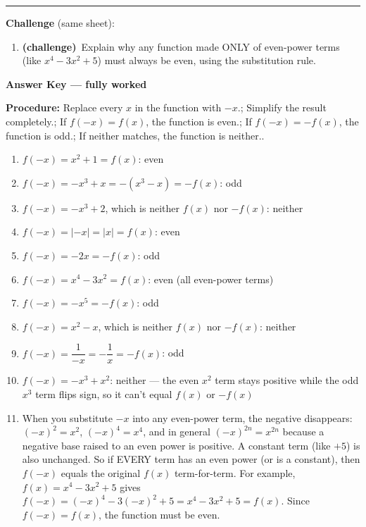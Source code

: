 \documentclass[12pt]{article}
\begin{document}
\vspace{0.2cm}\hrule\vspace{0.3cm}
\textbf{Challenge} (same sheet):\\[4pt]
\begin{enumerate}[label=\textbf{\arabic*.}, start=11, itemsep=2.2cm]
  \item \textbf{(challenge)}\ Explain why any function made ONLY of even-power terms (like $x^4-3x^2+5$) must always be even, using the substitution rule.
\end{enumerate}

\newpage

\begin{center}{\Large \textbf{Answer Key --- fully worked}}\end{center}
\vspace{0.25cm}
\textbf{Procedure:} Replace every $x$ in the function with $-x$.; Simplify the result completely.; If $f(-x)=f(x)$, the function is even.; If $f(-x)=-f(x)$, the function is odd.; If neither matches, the function is neither..\\[8pt]
\begin{enumerate}[label=\textbf{\arabic*.},itemsep=7pt]
  \item $f(-x)=x^{2}+1=f(x)$: even
  \item $f(-x)=-x^{3}+x=-(x^{3}-x)=-f(x)$: odd
  \item $f(-x)=-x^{3}+2$, which is neither $f(x)$ nor $-f(x)$: neither
  \item $f(-x)=|-x|=|x|=f(x)$: even
  \item $f(-x)=-2x=-f(x)$: odd
  \item $f(-x)=x^{4}-3x^{2}=f(x)$: even (all even-power terms)
  \item $f(-x)=-x^{5}=-f(x)$: odd
  \item $f(-x)=x^{2}-x$, which is neither $f(x)$ nor $-f(x)$: neither
  \item $f(-x)=\dfrac{1}{-x}=-\dfrac{1}{x}=-f(x)$: odd
  \item $f(-x)=-x^{3}+x^{2}$: neither --- the even $x^2$ term stays positive while the odd $x^3$ term flips sign, so it can't equal $f(x)$ or $-f(x)$
  \item When you substitute $-x$ into any even-power term, the negative disappears: $(-x)^2=x^2$, $(-x)^4=x^4$, and in general $(-x)^{2n}=x^{2n}$ because a negative base raised to an even power is positive. A constant term (like $+5$) is also unchanged. So if EVERY term has an even power (or is a constant), then $f(-x)$ equals the original $f(x)$ term-for-term. For example, $f(x)=x^4-3x^2+5$ gives $f(-x)=(-x)^4-3(-x)^2+5=x^4-3x^2+5=f(x)$. Since $f(-x)=f(x)$, the function must be even.
\end{enumerate}
\end{document}
